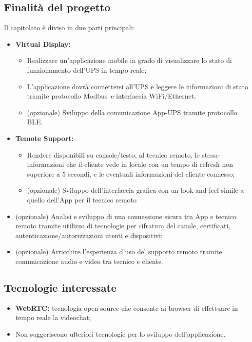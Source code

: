 	\subsection{Finalità del progetto}
		Il capitolato è diviso in due parti principali:
		\begin {itemize}
			\item \textbf{Virtual Display:}
			\begin{itemize}
				\item Realizzare un’applicazione mobile in grado di visualizzare lo stato di funzionamento dell’UPS in tempo reale;
				\item L’applicazione dovrà connettersi all’UPS\glo{} e leggere le informazioni di stato tramite protocollo Modbus\glo\ e interfaccia WiFi/Ethernet.
				\item (opzionale) Sviluppo della comunicazione App-UPS\glo{} tramite protocollo BLE\glo.
			\end{itemize}
			\item \textbf{Temote Support:}
			\begin{itemize}
				\item Rendere disponibili su console/testo, al tecnico remoto, le stesse informazioni che il cliente vede in locale con un tempo di refresh non superiore a 5 secondi, e le eventuali informazioni del cliente connesso;
				\item (opzionale) Sviluppo dell’interfaccia grafica con un look and feel simile a quello dell’App per il tecnico remoto
			\end{itemize}
			\item (opzionale) Analisi e sviluppo di una connessione sicura tra App e tecnico remoto tramite utilizzo di	tecnologie per cifratura del canale, certificati, autenticazione/autorizzazioni utenti e dispositivi;
			\item (opzionale) Arricchire l’esperienza d’uso del supporto remoto tramite comunicazione audio e video tra	tecnico e cliente.
		\end {itemize}

	\subsection {Tecnologie interessate}
		\begin {itemize}
			\item \textbf{WebRTC:} tecnologia open source\glo{} che consente ai browser di effettuare in tempo reale la videochat;
			\item Non suggeriscono ulteriori tecnologie per lo sviluppo dell'applicazione.
		\end {itemize}

